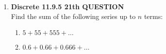 \documentclass{article}
\begin{document}
\begin{enumerate}
    
    \item \textbf{Discrete  11.9.5 21th QUESTION}\\
          Find the sum of the following series up to \(n\) terms:
          \begin{enumerate}
              \item \(5 + 55 + 555 + \ldots\)
              \item \(0.6 + 0.66 + 0.666 + \ldots\)
          \end{enumerate}
  \end{enumerate}
  
\end{document}
